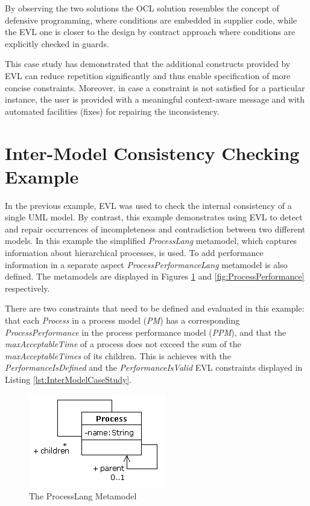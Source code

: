 By observing the two solutions the OCL solution resembles the concept of defensive programming, where conditions are embedded in supplier code, while the EVL one is closer to the design by contract \cite{Meyer97} approach where conditions are explicitly checked in guards.

This case study has demonstrated that the additional constructs provided by EVL can reduce repetition significantly and thus enable specification of more concise constraints. Moreover, in case a constraint is not satisfied for a particular instance, the user is provided with a meaningful context-aware message and with automated facilities (fixes) for repairing the inconsistency.

\section{Inter-Model Consistency Checking Example}
\label{sec:EvlInterModelExample}

In the previous example, EVL was used to check the internal consistency of a single UML model. By contrast, this example demonstrates using EVL to detect and repair occurrences of incompleteness and contradiction between two different models. In this example the simplified \emph{ProcessLang} metamodel, which captures information about hierarchical processes, is used. To add performance information in a separate aspect \emph{ProcessPerformanceLang} metamodel is also defined. The metamodels are displayed in Figures \ref{fig:Process} and \ref{fig:ProcessPerformance} respectively.

There are two constraints that need to be defined and evaluated in this example: that each \emph{Process} in a process model (\emph{PM}) has a corresponding \emph{ProcessPerformance} in the process performance model (\emph{PPM}), and that the \emph{maxAcceptableTime} of a process does not exceed the sum of the \emph{maxAcceptableTimes} of its children. This is achieves with the \emph{PerformanceIsDefined} and the \emph{PerformanceIsValid} EVL constraints displayed in Listing \ref{lst:InterModelCaseStudy}.

\begin{figure}
	\centering
		\includegraphics{images/Process.png}
	\caption{The ProcessLang Metamodel}
	\label{fig:Process}
\end{figure}

